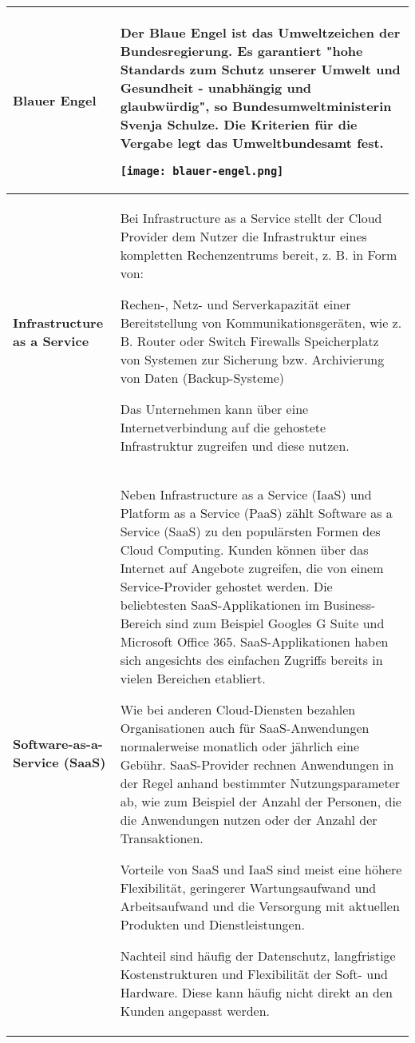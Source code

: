 \documentclass[asp1.tex]{subfiles}
\begin{document}
\begin{longtable}{|p{}|p{}|}
        \textbf{Blauer Engel}&
        Der \textbf{Blaue Engel} ist das Umweltzeichen der Bundesregierung. Es garantiert "hohe Standards zum Schutz unserer Umwelt und Gesundheit - unabhängig und glaubwürdig", so Bundesumweltministerin Svenja Schulze. Die Kriterien für die Vergabe legt das Umweltbundesamt fest.

        \texttt{[image: blauer-engel.png]}
        \\\hline

        \textbf{Infrastructure as a Service}&
        Bei Infrastructure as a Service stellt der Cloud Provider dem Nutzer die Infrastruktur eines kompletten Rechenzentrums bereit, z. B. in Form von:
        \begin{outline}
            \1 Rechen-, Netz- und Serverkapazität
            \1 einer Bereitstellung von Kommunikationsgeräten, wie z. B. Router oder Switch
            \1 Firewalls
            \1 Speicherplatz
            \1 von Systemen zur Sicherung bzw. Archivierung von Daten (Backup-Systeme)
        \end{outline}
        Das Unternehmen kann über eine Internetverbindung auf die gehostete Infrastruktur zugreifen und diese nutzen.
        \\\hline

        \textbf{Software-as-a-Service (SaaS)}&
        Neben Infrastructure as a Service (IaaS) und Platform as a Service (PaaS) zählt Software as a Service (SaaS) zu den populärsten Formen des Cloud Computing. Kunden können über das Internet auf Angebote zugreifen, die von einem Service-Provider gehostet werden. Die beliebtesten SaaS-Applikationen im Business-Bereich sind zum Beispiel Googles G Suite und Microsoft Office 365. SaaS-Applikationen haben sich angesichts des einfachen Zugriffs bereits in vielen Bereichen etabliert.

        Wie bei anderen Cloud-Diensten bezahlen Organisationen auch für SaaS-Anwendungen normalerweise monatlich oder jährlich eine Gebühr. SaaS-Provider rechnen Anwendungen in der Regel anhand bestimmter Nutzungsparameter ab, wie zum Beispiel der Anzahl der Personen, die die Anwendungen nutzen oder der Anzahl der Transaktionen.

        Vorteile von SaaS und IaaS sind meist eine höhere Flexibilität, geringerer Wartungsaufwand und Arbeitsaufwand und die Versorgung mit aktuellen Produkten und Dienstleistungen.

        Nachteil sind häufig der Datenschutz, langfristige Kostenstrukturen und Flexibilität der Soft- und Hardware. Diese kann häufig nicht direkt an den Kunden angepasst werden.


        \\\hline
\end{longtable}
\end{document}
